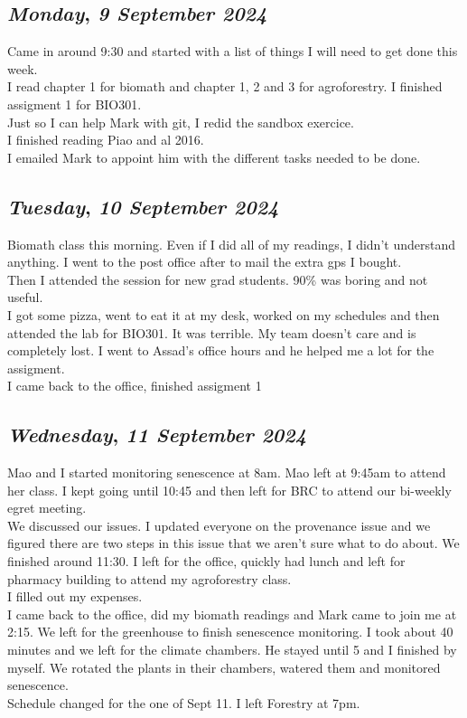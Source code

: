 \def\day{\textit{9 September 2024}}
\def\weekday{\textit{Monday}}
\subsection*{\weekday, \day}
Came in around 9:30 and started with a list of things I will need to get done this week.\\
I read chapter 1 for biomath and chapter 1, 2 and 3 for agroforestry. I finished assigment 1 for BIO301.\\
Just so I can help Mark with git, I redid the sandbox exercice. \\
I finished reading Piao and al 2016. \\
I emailed Mark to appoint him with the different tasks needed to be done. 

\def\day{\textit{10 September 2024}}
\def\weekday{\textit{Tuesday}}
\subsection*{\weekday, \day}
Biomath class this morning. Even if I did all of my readings, I didn't understand anything. I went to the post office after to mail the extra gps I bought.\\
Then I attended the session for new grad students. 90\% was boring and not useful.\\
I got some pizza, went to eat it at my desk, worked on my schedules and then attended the lab for BIO301. It was terrible. My team doesn't care and is completely lost. I went to Assad's office hours and he helped me a lot for the assigment.\\ 
I came back to the office, finished assigment 1 

\def\day{\textit{11 September 2024}}
\def\weekday{\textit{Wednesday}}
\subsection*{\weekday, \day}
Mao and I started monitoring senescence at 8am. Mao left at 9:45am to attend her class. I kept going until 10:45 and then left for BRC to attend our bi-weekly egret meeting.\\
We discussed our issues. I updated everyone on the provenance issue and we figured there are two steps in this issue that we aren't sure what to do about. We finished around 11:30. I left for the office, quickly had lunch and left for pharmacy building to attend my agroforestry class.\\
I filled out my expenses. \\
I came back to the office, did my biomath readings and Mark came to join me at 2:15. We left for the greenhouse to finish senescence monitoring. I took about 40 minutes and we left for the climate chambers. He stayed until 5 and I finished by myself. We rotated the plants in their chambers, watered them and monitored senescence.\\
Schedule changed for the one of Sept 11.
I left Forestry at 7pm. 

